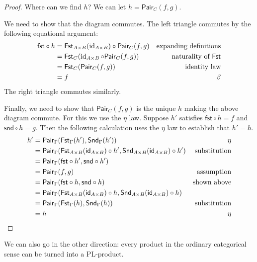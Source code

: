 \begin{proof}
Where can we find $h$? We can let $h = \mathsf{Pair}_C(f, g)$. 

We need to show that the diagram commutes. The left triangle commutes by the following equational argument:
\begin{align*}
  \mathsf{fst} \circ h
    &= \mathsf{Fst}_{A \times B} (\operatorname{id}_{A \times B}) \circ \mathsf{Pair}_C(f, g) & \text{expanding definitions} \\
    &= \mathsf{Fst}_C(\operatorname{id}_{A \times B} \circ \mathsf{Pair}_C(f, g)) & \text{naturality of \(\mathsf{Fst}\)}\\
    &= \mathsf{Fst}_C(\mathsf{Pair}_C(f, g)) & \text{identity law}\\
    &= f & \text{\(\beta\)}
\end{align*}
The right triangle commutes similarly.

Finally, we need to show that \(\mathsf{Pair}_C(f,g)\) is the unique \(h\) making the above diagram commute.
For this we use the \(\eta\) law.
Suppose \(h'\) satisfies \(\mathsf{fst} \circ h = f\) and \(\mathsf{snd} \circ h = g\).
  Then the following calculation uses the \(\eta\) law to establish that \(h' = h\).
  \begin{align*}
    h' &= \mathsf{Pair}_\Gamma(\mathsf{Fst}_\Gamma(h'),\mathsf{Snd}_\Gamma(h')) & \text{\(\eta\)} \\
     &= \mathsf{Pair}_\Gamma(\mathsf{Fst}_{A\times B}(\mathsf{id}_{A\times B})\circ h',\mathsf{Snd}_{A\times B}(\mathsf{id}_{A\times B})\circ h') & \text{substitution} \\
     &= \mathsf{Pair}_\Gamma(\mathsf{fst}\circ h',\mathsf{snd}\circ h') & \\
     &= \mathsf{Pair}_\Gamma(f,g) & \text{assumption} \\
     &= \mathsf{Pair}_\Gamma(\mathsf{fst}\circ h,\mathsf{snd} \circ h) & \text{shown above} \\
     &= \mathsf{Pair}_\Gamma(\mathsf{Fst}_{A\times B}(\mathsf{id}_{A\times B})\circ h,\mathsf{Snd}_{A\times B}(\mathsf{id}_{A\times B}) \circ h) & \\
     &= \mathsf{Pair}_\Gamma(\mathsf{Fst}_\Gamma(h),\mathsf{Snd}_\Gamma(h)) & \text{substitution} \\
     &= h & \text{\(\eta\)}
  \end{align*}
\end{proof}
We can also go in the other direction: every product in the ordinary categorical sense can be turned into a PL-product.

